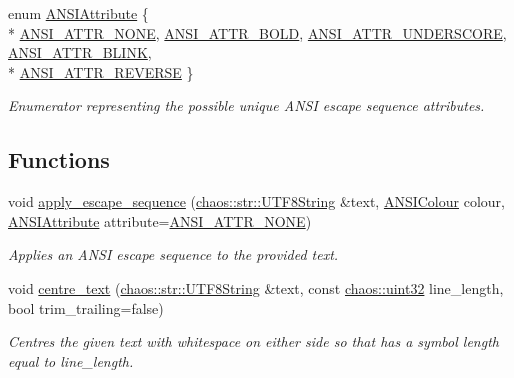 \begin{DoxyCompactItemize}
\item 
enum \hyperlink{namespacechaos_1_1io_1_1format_af01119682ec0bc616b49641e0c2a7ccf}{A\+N\+S\+I\+Attribute} \{ \\*
\hyperlink{namespacechaos_1_1io_1_1format_af01119682ec0bc616b49641e0c2a7ccfa3154b286513beb167bb516ea15f1cfb5}{A\+N\+S\+I\+\_\+\+A\+T\+T\+R\+\_\+\+N\+O\+N\+E}, 
\hyperlink{namespacechaos_1_1io_1_1format_af01119682ec0bc616b49641e0c2a7ccfaada31e77e1e80ea78e0cd08a126271b3}{A\+N\+S\+I\+\_\+\+A\+T\+T\+R\+\_\+\+B\+O\+L\+D}, 
\hyperlink{namespacechaos_1_1io_1_1format_af01119682ec0bc616b49641e0c2a7ccfa2f1d142ccf489cba5710445abd48555f}{A\+N\+S\+I\+\_\+\+A\+T\+T\+R\+\_\+\+U\+N\+D\+E\+R\+S\+C\+O\+R\+E}, 
\hyperlink{namespacechaos_1_1io_1_1format_af01119682ec0bc616b49641e0c2a7ccfacd3671458d96396a0fec66c993244186}{A\+N\+S\+I\+\_\+\+A\+T\+T\+R\+\_\+\+B\+L\+I\+N\+K}, 
\\*
\hyperlink{namespacechaos_1_1io_1_1format_af01119682ec0bc616b49641e0c2a7ccfaa7b58f4c0365d47d2bc98a4587521806}{A\+N\+S\+I\+\_\+\+A\+T\+T\+R\+\_\+\+R\+E\+V\+E\+R\+S\+E}
 \}\begin{DoxyCompactList}\small\item\em Enumerator representing the possible unique A\+N\+S\+I escape sequence attributes. \end{DoxyCompactList}
\end{DoxyCompactItemize}
\subsection*{Functions}
\begin{DoxyCompactItemize}
\item 
void \hyperlink{namespacechaos_1_1io_1_1format_a005869cc85ba6d9b0fcfad31cf56bda7}{apply\+\_\+escape\+\_\+sequence} (\hyperlink{classchaos_1_1str_1_1_u_t_f8_string}{chaos\+::str\+::\+U\+T\+F8\+String} \&text, \hyperlink{namespacechaos_1_1io_1_1format_aa30dcff2478ffc94e33504c8886a5b1a}{A\+N\+S\+I\+Colour} colour, \hyperlink{namespacechaos_1_1io_1_1format_af01119682ec0bc616b49641e0c2a7ccf}{A\+N\+S\+I\+Attribute} attribute=\hyperlink{namespacechaos_1_1io_1_1format_af01119682ec0bc616b49641e0c2a7ccfa3154b286513beb167bb516ea15f1cfb5}{A\+N\+S\+I\+\_\+\+A\+T\+T\+R\+\_\+\+N\+O\+N\+E})
\begin{DoxyCompactList}\small\item\em Applies an A\+N\+S\+I escape sequence to the provided text. \end{DoxyCompactList}\item 
void \hyperlink{namespacechaos_1_1io_1_1format_a626396566ef32d2401d4a0e91594a4a2}{centre\+\_\+text} (\hyperlink{classchaos_1_1str_1_1_u_t_f8_string}{chaos\+::str\+::\+U\+T\+F8\+String} \&text, const \hyperlink{namespacechaos_a3b3a47ba1e284655bf1a30c441121c60}{chaos\+::uint32} line\+\_\+length, bool trim\+\_\+trailing=false)
\begin{DoxyCompactList}\small\item\em Centres the given text with whitespace on either side so that has a symbol length equal to line\+\_\+length. \end{DoxyCompactList}\end{DoxyCompactItemize}


